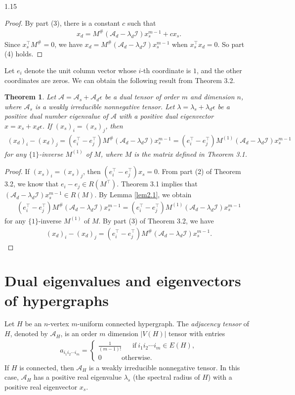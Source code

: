 \documentclass[preprint,12pt]{elsarticle}
\newtheorem{thm}{Theorem}[section]
\begin{document}
\begin{spacing}{1.15}
\begin{proof}
By part (3), there is a constant $c$ such that
\begin{eqnarray*}
x_d=M^\#(\mathcal{A}_d-\lambda_d\mathcal{I})x_s^{m-1}+cx_s.
\end{eqnarray*}
Since $x_s^\top M^\#=0$, we have $x_d=M^\#(\mathcal{A}_d-\lambda_d\mathcal{I})x_s^{m-1}$ when $x_s^\top x_d=0$. So part (4) holds.
\end{proof}
Let $e_i$ denote the unit column vector whose $i$-th coordinate is $1$, and the other coordinates are zeros. We can obtain the following result from Theorem 3.2.
\begin{thm}
Let $\mathcal{A}=\mathcal{A}_s+\mathcal{A}_d\epsilon$ be a dual tensor of order $m$ and dimension $n$, where $\mathcal{A}_s$ is a weakly irreducible nonnegative tensor. Let $\lambda=\lambda_s+\lambda_d\epsilon$ be a positive dual number eigenvalue of $\mathcal{A}$ with a positive dual eigenvector $x=x_s+x_d\epsilon$. If $(x_s)_i=(x_s)_j$, then
\begin{eqnarray*}
(x_d)_i-(x_d)_j=(e_i^\top-e_j^\top)M^\#(\mathcal{A}_d-\lambda_d\mathcal{I})x_s^{m-1}=(e_i^\top-e_j^\top)M^{(1)}(\mathcal{A}_d-\lambda_d\mathcal{I})x_s^{m-1}
\end{eqnarray*}
for any $\{1\}$-inverse $M^{(1)}$ of $M$, where $M$ is the matrix defined in Theorem 3.1.
\end{thm}
\begin{proof}
If $(x_s)_i=(x_s)_j$, then $(e_i^\top-e_j^\top)x_s=0$. From part (2) of Theorem 3.2, we know that $e_i-e_j\in R(M^\top)$. Theorem 3.1 implies that $(\mathcal{A}_d-\lambda_d\mathcal{I})x_s^{m-1}\in R(M)$. By Lemma \ref{lem2.1}, we obtain
\begin{eqnarray*}
(e_i^\top-e_j^\top)M^\#(\mathcal{A}_d-\lambda_d\mathcal{I})x_s^{m-1}=(e_i^\top-e_j^\top)M^{(1)}(\mathcal{A}_d-\lambda_d\mathcal{I})x_s^{m-1}
\end{eqnarray*}
for any $\{1\}$-inverse $M^{(1)}$ of $M$. By part (3) of Theorem 3.2, we have
\begin{eqnarray*}
(x_d)_i-(x_d)_j=(e_i^\top-e_j^\top)M^\#(\mathcal{A}_d-\lambda_d\mathcal{I})x_s^{m-1}.
\end{eqnarray*}
\end{proof}
\section{Dual eigenvalues and eigenvectors of hypergraphs}
Let $H$ be an $n$-vertex $m$-uniform connected hypergraph. The \textit{adjacency tensor} of $H$, denoted by $\mathcal{A}_H$, is an order $m$ dimension $|V(H)|$ tensor with entries
\begin{eqnarray*}
a_{i_1i_2\cdots i_m}=\begin{cases}\frac{1}{(m-1)!}~~~~~~~\mbox{if}~i_1i_2\cdots i_m\in E(H),\\
0~~~~~~~~~~~~~\mbox{otherwise}.\end{cases}
\end{eqnarray*}
If $H$ is connected, then $\mathcal{A}_H$ is a weakly irreducible nonnegative tensor. In this case, $\mathcal{A}_H$ has a positive real eigenvalue $\lambda_s$ (the spectral radius of $H$) with a positive real eigenvector $x_s$.


\end{spacing}
\end{document}
